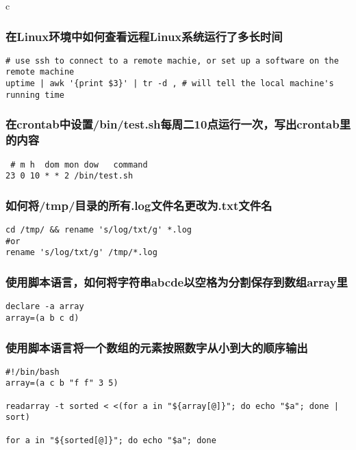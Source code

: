 \documentclass{article}
\begin{document}
\begin{mitned}{c}
\subsubsection{在Linux环境中如何查看远程Linux系统运行了多长时间}
\begin{verbatim}
# use ssh to connect to a remote machie, or set up a software on the remote machine
uptime | awk '{print $3}' | tr -d , # will tell the local machine's running time

\end{verbatim}

\subsubsection{在crontab中设置/bin/test.sh每周二10点运行一次，写出crontab里的内容}
\begin{verbatim}
 # m h  dom mon dow   command
23 0 10 * * 2 /bin/test.sh

\end{verbatim}

\subsubsection{如何将/tmp/目录的所有.log文件名更改为.txt文件名}
\begin{verbatim}
cd /tmp/ && rename 's/log/txt/g' *.log
#or
rename 's/log/txt/g' /tmp/*.log
\end{verbatim}

\subsubsection{使用脚本语言，如何将字符串abcde以空格为分割保存到数组array里}
\begin{verbatim}
declare -a array
array=(a b c d)
\end{verbatim}


\subsubsection{使用脚本语言将一个数组的元素按照数字从小到大的顺序输出}
\begin{verbatim}
#!/bin/bash
array=(a c b "f f" 3 5)

readarray -t sorted < <(for a in "${array[@]}"; do echo "$a"; done | sort)

for a in "${sorted[@]}"; do echo "$a"; done

\end{verbatim}


\end{mitned}
\end{document}
